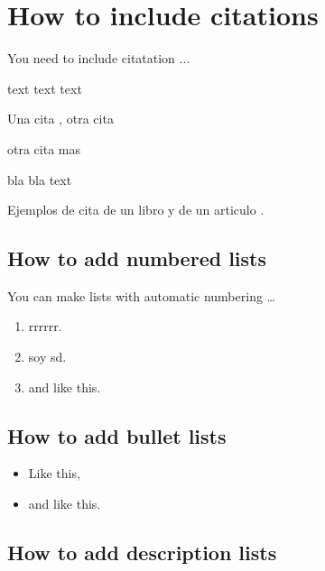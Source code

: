 \documentclass[12pt]{report} %
\begin{document}
\section{How to include citations}
\label{howtocite}

You need to include citatation ...

 
text text text


Una cita \cite{LawCommission2021}, otra cita

 

\cite{LawCommission2020} otra cita mas

\cite{LawCommissionSummary2020}


bla bla text



\cite{Samer2017}

\cite{PrimaveraAaron2018}


\cite{Andersson2020}



Ejemplos de cita de un libro \cite{Andersson2020} y 
de un articulo \cite{Samer2017}.



 
\subsection{How to add numbered lists}

You can make lists with automatic numbering \dots

\begin{enumerate}
  \item rrrrrr.
  \item    soy sd.
  \item and like this.
\end{enumerate}


\subsection{How to add bullet lists}

\begin{itemize}
 \item Like this,
 \item and like this.
\end{itemize}


\subsection{How to add description lists}
\end{document}
